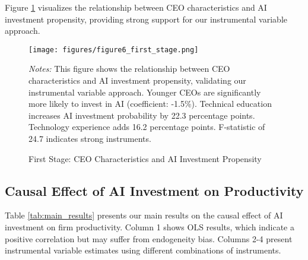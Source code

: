 \documentclass[12pt, a4paper]{article}
\begin{document}
Figure \ref{fig:first_stage} visualizes the relationship between CEO characteristics and AI investment propensity, providing strong support for our instrumental variable approach.

\begin{figure}[H]
\centering
\texttt{[image: figures/figure6\_first\_stage.png]}
\caption{First Stage: CEO Characteristics and AI Investment Propensity}
\label{fig:first_stage}
\begin{minipage}{\textwidth}
\footnotesize
\textit{Notes:} This figure shows the relationship between CEO characteristics and AI investment propensity, validating our instrumental variable approach. Younger CEOs are significantly more likely to invest in AI (coefficient: -1.5\%). Technical education increases AI investment probability by 22.3 percentage points. Technology experience adds 16.2 percentage points. F-statistic of 24.7 indicates strong instruments.
\end{minipage}
\end{figure}

\subsection{Causal Effect of AI Investment on Productivity}

Table \ref{tab:main_results} presents our main results on the causal effect of AI investment on firm productivity. Column 1 shows OLS results, which indicate a positive correlation but may suffer from endogeneity bias. Columns 2-4 present instrumental variable estimates using different combinations of instruments.
\end{document}
